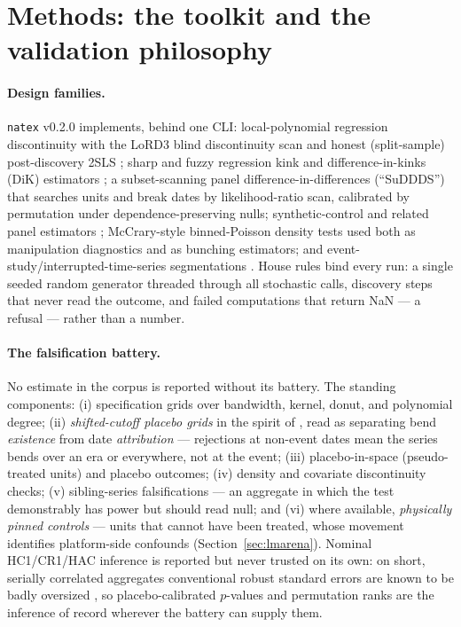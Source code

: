 \documentclass[11pt]{article}
\newcommand{\natex}{\texttt{natex}}
\begin{document}
\section{Methods: the toolkit and the validation philosophy}\label{sec:methods}

\paragraph{Design families.} \natex{} v0.2.0 implements, behind one CLI:
local-polynomial regression discontinuity with the LoRD3 blind
discontinuity scan and honest (split-sample) post-discovery 2SLS
\cite{herlands2018}; sharp and fuzzy regression kink and
difference-in-kinks (DiK) estimators \cite{card2015,bockerman2025}; a
subset-scanning panel difference-in-differences (``SuDDDS'') that searches
units and break dates by likelihood-ratio scan, calibrated by permutation
under dependence-preserving nulls; synthetic-control and related panel
estimators \cite{abadie2010,abadie2021}; McCrary-style binned-Poisson
density tests \cite{mccrary2008} used both as manipulation diagnostics and
as bunching estimators; and event-study/interrupted-time-series
segmentations \cite{bernal2017}. House rules bind every run: a single seeded
random generator threaded through all stochastic calls, discovery steps that
never read the outcome, and failed computations that return NaN --- a
refusal --- rather than a number.

\paragraph{The falsification battery.} No estimate in the corpus is reported
without its battery. The standing components: (i) specification grids over
bandwidth, kernel, donut, and polynomial degree; (ii) \emph{shifted-cutoff
placebo grids} in the spirit of \cite{ganong2018}, read as separating bend
\emph{existence} from date \emph{attribution} --- rejections at non-event
dates mean the series bends over an era or everywhere, not at the event;
(iii) placebo-in-space (pseudo-treated units) and placebo outcomes; (iv)
density and covariate discontinuity checks; (v) sibling-series
falsifications --- an aggregate in which the test demonstrably has power but
should read null; and (vi) where available, \emph{physically pinned
controls} --- units that cannot have been treated, whose movement identifies
platform-side confounds (Section~\ref{sec:lmarena}). Nominal HC1/CR1/HAC
inference is reported but never trusted on its own: on short, serially
correlated aggregates conventional robust standard errors are known to be
badly oversized \cite{bertrand2004,cameron2015,hausman2018}, so
placebo-calibrated $p$-values and permutation ranks are the inference of
record wherever the battery can supply them.
\end{document}
